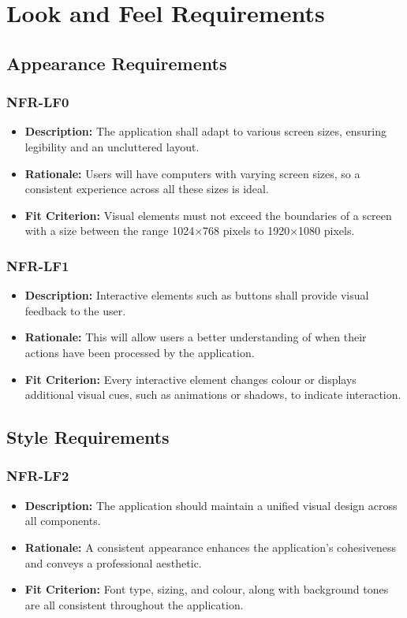 \documentclass[12pt]{article}
\begin{document}
\section{Look and Feel Requirements}
\subsection{Appearance Requirements}
\subsubsection*{NFR-LF0}
\begin{itemize}
  \item \textbf{Description:} The application shall adapt to various screen sizes, ensuring legibility and an uncluttered layout.
  \item \textbf{Rationale:} Users will have computers with varying screen sizes, so a consistent experience across all these sizes is ideal.
  \item \textbf{Fit Criterion:} Visual elements must not exceed the boundaries of a screen with a size between the range 1024×768 pixels to 1920×1080 pixels.
\end{itemize}
\subsubsection*{NFR-LF1}
\begin{itemize}
  \item \textbf{Description:} Interactive elements such as buttons shall provide visual feedback to the user.
  \item \textbf{Rationale:} This will allow users a better understanding of when their actions have been processed by the application.
  \item \textbf{Fit Criterion:} Every interactive element changes colour or displays additional visual cues, such as animations or shadows, to indicate interaction.
\end{itemize}
\subsection{Style Requirements}
\subsubsection*{NFR-LF2}
\begin{itemize}
  \item \textbf{Description:} The application should maintain a unified visual design across all components.
  \item \textbf{Rationale:} A consistent appearance enhances the application's cohesiveness and conveys a professional aesthetic.
  \item \textbf{Fit Criterion:} Font type, sizing, and colour, along with background tones are all consistent throughout the application.
\end{itemize}
\end{document}
